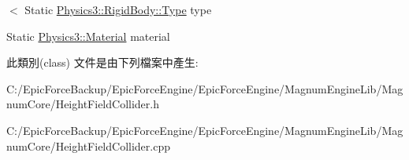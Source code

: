 $<$ Static \hyperlink{class_magnum_1_1_physics3_1_1_rigid_body_a429aa4fb7256b083334c86cdcd0d6b31}{Physics3\+::\+Rigid\+Body\+::\+Type} type 

Static \hyperlink{class_magnum_1_1_physics3_1_1_material}{Physics3\+::\+Material} material 

此類別(class) 文件是由下列檔案中產生\+:\begin{DoxyCompactItemize}
\item 
C\+:/\+Epic\+Force\+Backup/\+Epic\+Force\+Engine/\+Epic\+Force\+Engine/\+Magnum\+Engine\+Lib/\+Magnum\+Core/Height\+Field\+Collider.\+h\item 
C\+:/\+Epic\+Force\+Backup/\+Epic\+Force\+Engine/\+Epic\+Force\+Engine/\+Magnum\+Engine\+Lib/\+Magnum\+Core/Height\+Field\+Collider.\+cpp\end{DoxyCompactItemize}
